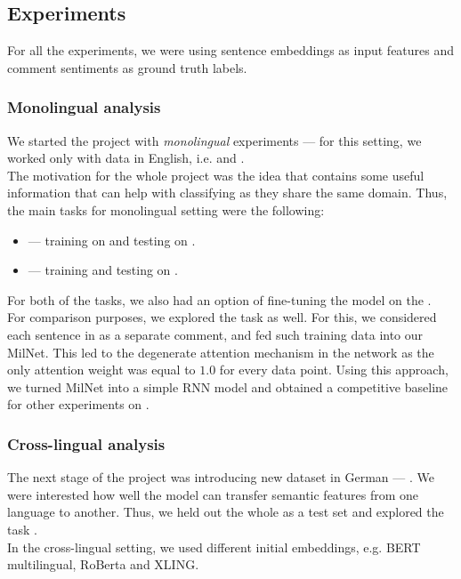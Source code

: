 \subsection{Experiments}
\label{experimentsSection}
For all the experiments, we were using sentence embeddings as input features and comment sentiments as ground truth labels.
\subsubsection{Monolingual analysis}
We started the project with {\it monolingual} experiments --- for this setting, we worked only with data in English, i.e. \dataEN and \dataORG. \\
The motivation for the whole project was the idea that \dataEN contains some useful information that can help with classifying \dataORG as they share the same domain. Thus, the main tasks for monolingual setting were the following:
\begin{itemize}
    \item \taskORG --- training on \dataEN and testing on \dataORG.
    \item \taskEN --- training and testing on \dataEN.
\end{itemize}
For both of the tasks, we also had an option of fine-tuning the model on the \dataORG. \\
For comparison purposes, we explored the task \taskORGORG as well. For this, we considered each sentence in \dataORG as a separate comment, and fed such training data into our MilNet. This led to the degenerate attention mechanism in the network as the only attention weight was equal to $1.0$ for every data point. Using this approach, we turned MilNet into a simple RNN model and obtained a competitive baseline for other experiments on \dataORG.

\subsubsection{Cross-lingual analysis}
The next stage of the project was introducing new dataset in German --- \dataDE. We were interested how well the model can transfer semantic features from one language to another. Thus, we held out the whole \dataDE as a test set and explored the task \taskDE. \\
In the cross-lingual setting, we used different initial embeddings, e.g. BERT multilingual, RoBerta and XLING.
